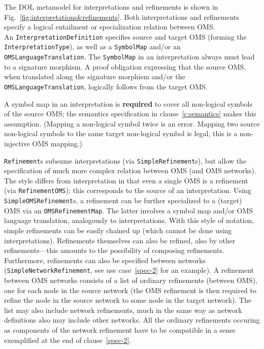 \documentclass[10pt, a4paper]{isov2}
\newcommand*{\syntax}[1]{\texttt{#1}}
\newcommand*{\required}{\textbf{required}\xspace}
\renewcommand{\clauserefname}{clause}
\renewcommand{\cref}[1]{\clauserefname~\ref{#1}}
\begin{document}
The DOL metamodel for  interpretations and refinements is shown in 
Fig.~\ref{fig:interpretations&refinements}.
Both interpretations and refinements specify a logical entailment or
specialization relation between OMS.\\
 An
\syntax{InterpretationDefinition} specifies source and target OMS
(forming the \syntax{InterpretationType}), as well as a
\syntax{SymbolMap} and/or an \syntax{OMSLanguageTranslation}.  The
\syntax{SymbolMap} in an interpretation always must lead to a
signature morphism. A proof obligation expressing that the source OMS,
when translated along the signature morphism and/or the
\syntax{OMSLanguageTranslation}, logically follows from the target OMS.

A symbol map in an interpretation is \required to cover all
non-logical symbols of the source OMS; the semantics specification in
\cref{c:semantics} makes this assumption. ({Mapping a non-logical
  symbol twice is an error. Mapping two source non-logical symbols to
  the same target non-logical symbol is legal, this is a non-injective
  OMS mapping.})

\syntax{Refinement}s subsume interpretations (via
\syntax{SimpleRefinement}s), but allow the specification of much more
complex relation between OMS (and OMS networks).  The style differs
from interpretation in that even a single OMS is a refinement (via
\syntax{RefinementOMS}); this corresponds to the source of an
interpretation. Using \syntax{SimpleOMSRefinement}s, a refinement can
be further specialized to a (target) OMS via an
\syntax{OMSRefinementMap}. The latter involves a symbol map and/or OMS
language translation, analogously to interpretations.  With this style
of notation, simple refinements can be easily chained up (which cannot
be done using interpretations).  Refinements themselves can
also be refined, also by other refinements---this amounts
to the possibility of composing refinements. Furthermore,
refinements can also be specified between networks
(\syntax{SimpleNetworkRefinement}, see use case~\ref{spec-2} for an example).  
A refinement between OMS networks
consists of a list of ordinary refinements (between OMS), one for
each node in the source network (the OMS refinement is then required
to refine the node in the source network to some node in the target
network). The list may also include network refinements, much in the
same way as network definitions also may include other networks.
All the ordinary refinements occuring as components of the
network refinement have to be compatible in a sense exemplified
at the end of clause~\ref{spec-2}.
\end{document}
